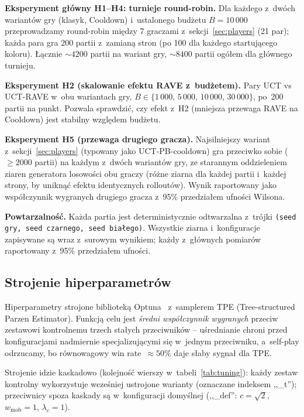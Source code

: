 \documentclass[11pt,a4paper]{article}
\begin{document}
\textbf{Eksperyment główny H1--H4: turnieje round-robin.} Dla każdego z~dwóch wariantów gry (klasyk, Cooldown) i~ustalonego budżetu $B = 10\,000$ przeprowadzamy round-robin między 7 graczami z~sekcji~\ref{sec:players} (21 par); każda para gra $200$ partii z~zamianą stron (po 100 dla każdego startującego koloru). Łącznie $\sim\!4200$ partii na wariant gry, $\sim\!8400$ partii ogółem dla głównego turnieju.

\textbf{Eksperyment H2 (skalowanie efektu RAVE z~budżetem).} Pary UCT vs UCT-RAVE w~obu wariantach gry, $B \in \{1\,000,\, 5\,000,\, 10\,000,\, 30\,000\}$, po~200 partii na punkt. Pozwala sprawdzić, czy efekt z~H2 (mniejsza przewaga RAVE na Cooldown) jest stabilny względem budżetu.

\textbf{Eksperyment H5 (przewaga drugiego gracza).} Najsilniejszy wariant z~sekcji~\ref{sec:players} (typowany jako UCT-PB-cooldown) gra przeciwko sobie ($\geq 2000$ partii) na każdym z~dwóch wariantów gry, ze starannym oddzieleniem ziaren generatora losowości obu graczy (różne ziarna dla każdej partii i~każdej strony, by uniknąć efektu identycznych rolloutów). Wynik raportowany jako współczynnik wygranych drugiego gracza z~95\% przedziałem ufności Wilsona.

\textbf{Powtarzalność.} Każda partia jest deterministycznie odtwarzalna z~trójki \texttt{(seed gry, seed czarnego, seed białego)}. Wszystkie ziarna i~konfiguracje zapisywane są wraz z~surowym wynikiem; każdy z~głównych pomiarów raportowany z~95\% przedziałem ufności.

\subsection{Strojenie hiperparametrów}\label{sec:tuning}

Hiperparametry strojone biblioteką Optuna~\cite{akiba2019optuna} z~samplerem TPE (Tree-structured Parzen Estimator). Funkcją celu jest \emph{średni współczynnik wygranych} przeciw zestawowi kontrolnemu trzech stałych przeciwników -- uśrednianie chroni przed konfiguracjami nadmiernie specjalizującymi się w~jednym przeciwniku, a~self-play odrzucamy, bo równowagowy win rate~$\approx 50\%$ daje słaby sygnał dla TPE.

Strojenie idzie kaskadowo (kolejność wierszy w~tabeli~\ref{tab:tuning}): każdy zestaw kontrolny wykorzystuje wcześniej ustrojone warianty (oznaczane indeksem ,,\_t''); przeciwnicy spoza kaskady są w~konfiguracji domyślnej (,,\_def'': $c{=}\sqrt 2$, $w_{\text{mob}}{=}1$, $\lambda_c{=}1$).
\end{document}

